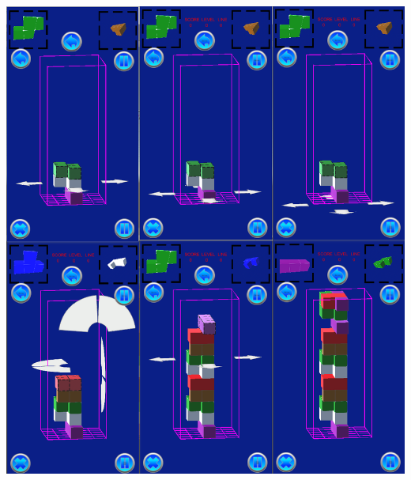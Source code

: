 \documentclass[9pt, b5paper]{article}
\begin{document}
\includegraphics[width=.9\linewidth]{./pic/readme_20221101_112720.png}
\end{document}
